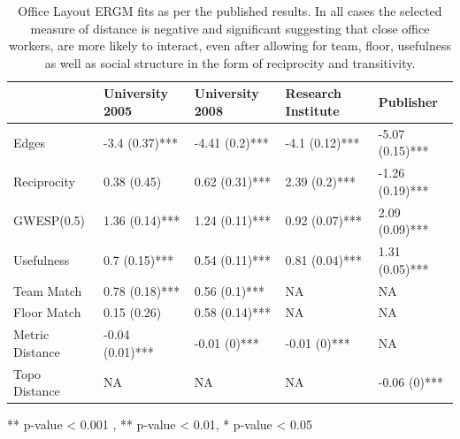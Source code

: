\documentclass[
]{statsoc}
\begin{document}
\begin{table}

\caption{\label{tab:unnamed-chunk-2}\label{tab:sailer_ergm_pub} Office Layout ERGM fits as per the published results. In all cases the selected measure of distance is negative and significant suggesting that close office workers, are more likely to interact, even after allowing for team, floor, usefulness as well as social structure in the form of reciprocity and transitivity.}
\centering
\begin{threeparttable}
\begin{tabular}[t]{lllll}
\toprule
  & University 2005 & University 2008 & Research Institute & Publisher\\
\midrule
\rowcolor{gray!6}  Edges & -3.4 (0.37)*** & -4.41 (0.2)*** & -4.1 (0.12)*** & -5.07 (0.15)***\\
Reciprocity & 0.38 (0.45) & 0.62 (0.31)*** & 2.39 (0.2)*** & -1.26 (0.19)***\\
\rowcolor{gray!6}  GWESP(0.5) & 1.36 (0.14)*** & 1.24 (0.11)*** & 0.92 (0.07)*** & 2.09 (0.09)***\\
Usefulness & 0.7 (0.15)*** & 0.54 (0.11)*** & 0.81 (0.04)*** & 1.31 (0.05)***\\
\rowcolor{gray!6}  Team Match & 0.78 (0.18)*** & 0.56 (0.1)*** & NA & NA\\
\addlinespace
Floor Match & 0.15 (0.26) & 0.58 (0.14)*** & NA & NA\\
\rowcolor{gray!6}  Metric Distance & -0.04 (0.01)*** & -0.01 (0)*** & -0.01 (0)*** & NA\\
Topo Distance & NA & NA & NA & -0.06 (0)***\\
\bottomrule
\end{tabular}
\begin{tablenotes}
\item *** p-value < 0.001 , ** p-value < 0.01, * p-value < 0.05
\end{tablenotes}
\end{threeparttable}
\end{table}
\end{document}
